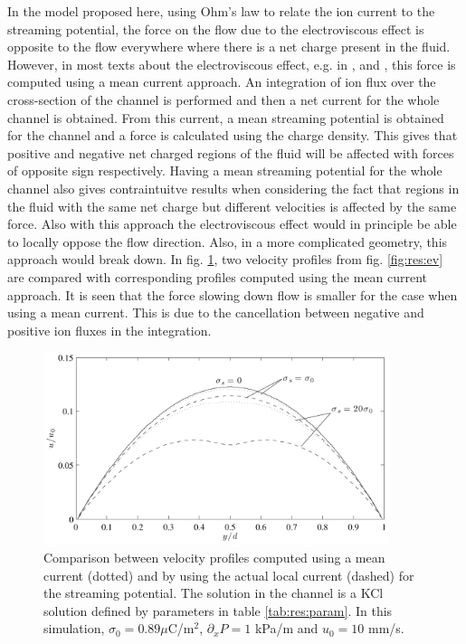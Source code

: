 In the model proposed here, using Ohm's law to relate the ion current
to the streaming potential, the force on the flow due to the
electroviscous effect is opposite to the flow everywhere where there
is a net charge present in the fluid. However, in most texts about the
electroviscous effect, e.g. in \cite{dongquing-ren-book},
\cite{wang-poi} and \cite{ren-elvis-paper}, this force is computed
using a mean current approach. An integration of ion flux over the
cross-section of the channel is performed and then a net current for
the whole channel is obtained. From this current, a mean streaming
potential is obtained for the channel and a force is calculated using
the charge density. This gives that positive and negative net charged
regions of the fluid will be affected with forces of opposite sign
respectively. Having a mean streaming potential for the whole channel
also gives contraintuitve results when considering the fact that
regions in the fluid with the same net charge but different velocities
is affected by the same force. Also with this approach the
electroviscous effect would in principle be able to locally oppose the
flow direction. Also, in a more complicated geometry, this approach
would break down. In fig. \ref{fig:res:ev_comp}, two velocity profiles
from fig. \ref{fig:res:ev} are compared with corresponding profiles
computed using the mean current approach. It is seen that the
force slowing down flow is smaller for the case when using a mean
current. This is due to the cancellation between negative and
positive ion fluxes in the integration.

\begin{figure}
\begin{center}
\includegraphics[width=0.9\textwidth]{fig/electrovisc_comp.pdf}
\end{center}
\caption[Comparison between electroviscous flow using the traditional
  and local approach.]{Comparison between velocity profiles computed
  using a mean current (dotted) and by using the actual local current
  (dashed) for the streaming potential. The solution in the channel is
  a KCl solution defined by parameters in table
  \ref{tab:res:param}. In this simulation, $\sigma_0 = 0.89
  \mu$C/m$^2$, $\partial_xP = 1$ kPa/m and $u_0 = 10$ mm/s. }
\label{fig:res:ev_comp}
\end{figure}
